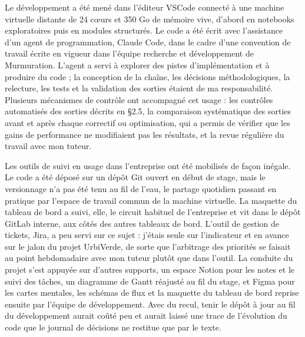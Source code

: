 \documentclass[a4paper,12pt]{report}
\begin{document}
Le développement a été mené dans l'éditeur VSCode connecté à une machine virtuelle distante de 24 cœurs et 350 Go de mémoire vive, d'abord en notebooks exploratoires puis en modules structurés. Le code a été écrit avec l'assistance d'un agent de programmation, Claude Code, dans le cadre d'une convention de travail écrite en vigueur dans l'équipe recherche et développement de Murmuration. L'agent a servi à explorer des pistes d'implémentation et à produire du code ; la conception de la chaîne, les décisions méthodologiques, la relecture, les tests et la validation des sorties étaient de ma responsabilité. Plusieurs mécanismes de contrôle ont accompagné cet usage : les contrôles automatisés des sorties décrits en §2.5, la comparaison systématique des sorties avant et après chaque correctif ou optimisation, qui a permis de vérifier que les gains de performance ne modifiaient pas les résultats, et la revue régulière du travail avec mon tuteur.
 
Les outils de suivi en usage dans l'entreprise ont été mobilisés de façon inégale. Le code a été déposé sur un dépôt Git ouvert en début de stage, mais le versionnage n'a pas été tenu au fil de l'eau, le partage quotidien passant en pratique par l'espace de travail commun de la machine virtuelle. La maquette du tableau de bord a suivi, elle, le circuit habituel de l'entreprise et vit dans le dépôt GitLab interne, aux côtés des autres tableaux de bord. L'outil de gestion de tickets, Jira, a peu servi sur ce sujet : j'étais seule sur l'indicateur et en avance sur le jalon du projet UrbiVerde, de sorte que l'arbitrage des priorités se faisait au point hebdomadaire avec mon tuteur plutôt que dans l'outil. La conduite du projet s'est appuyée sur d'autres supports, un espace Notion pour les notes et le suivi des tâches, un diagramme de Gantt réajusté au fil du stage, et Figma pour les cartes mentales, les schémas de flux et la maquette du tableau de bord reprise ensuite par l'équipe de développement. Avec du recul, tenir le dépôt à jour au fil du développement aurait coûté peu et aurait laissé une trace de l'évolution du code que le journal de décisions ne restitue que par le texte.
\end{document}

